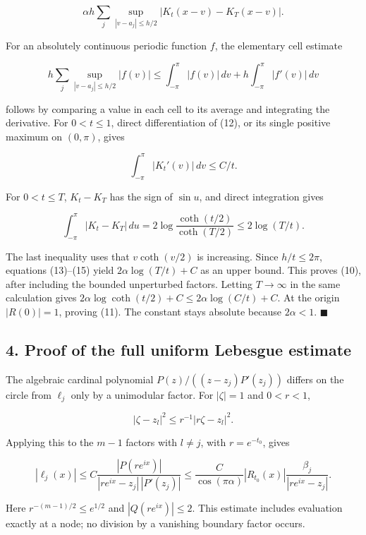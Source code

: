 \documentclass[10pt,a4paper]{article}
\begin{document}
\nopagebreak[4]
\[\alpha h\sum_j\sup_{|v-a_j|\le h/2}|K_t(x-v)-K_T(x-v)|. \tag{13}\]

For an absolutely continuous periodic function \(f\), the elementary
cell estimate

\nopagebreak[4]
\[h\sum_j\sup_{|v-a_j|\le h/2}|f(v)|
 \le\int_{-\pi}^{\pi}|f(v)|\,dv+h\int_{-\pi}^{\pi}|f'(v)|\,dv \tag{14}\]

follows by comparing a value in each cell to its average and integrating
the derivative. For \(0<t\le1\), direct differentiation of (12), or its
single positive maximum on \((0,\pi)\), gives

\nopagebreak[4]
\[\int_{-\pi}^{\pi}|K_t'(v)|\,dv\le C/t.\]

For \(0<t\le T\), \(K_t-K_T\) has the sign of \(\sin u\), and direct
integration gives

\nopagebreak[4]
\[\int_{-\pi}^{\pi}|K_t-K_T|\,du
 =2\log\frac{\coth(t/2)}{\coth(T/2)}
 \le2\log(T/t). \tag{15}\]

The last inequality uses that \(v\coth(v/2)\) is increasing. Since
\(h/t\le2\pi\), equations (13)--(15) yield \(2\alpha\log(T/t)+C\) as an
upper bound. This proves (10), after including the bounded unperturbed
factors. Letting \(T\to\infty\) in the same calculation gives
\(2\alpha\log\coth(t/2)+C\le2\alpha\log(C/t)+C\). At the origin
\(|R(0)|=1\), proving (11). The constant stays absolute because
\(2\alpha<1\). \ensuremath{\blacksquare}

\subsection{4. Proof of the full uniform Lebesgue
estimate}\label{proof-of-the-full-uniform-lebesgue-estimate}

The algebraic cardinal polynomial \(P(z)/((z-z_j)P'(z_j))\) differs on
the circle from \(\ell_j\) only by a unimodular factor. For
\(|\zeta|=1\) and \(0<r<1\),

\nopagebreak[4]
\[|\zeta-z_l|^2\le r^{-1}|r\zeta-z_l|^2.\]

Applying this to the \(m-1\) factors with \(l\ne j\), with
\(r=e^{-t_0}\), gives

\nopagebreak[4]
\[|\ell_j(x)|
 \le C\frac{|P(re^{ix})|}{|re^{ix}-z_j|\,|P'(z_j)|}
 \le\frac{C}{\cos(\pi\alpha)}
       |R_{t_0}(x)|\frac{\beta_j}{|re^{ix}-z_j|}. \tag{16}\]

Here \(r^{-(m-1)/2}\le e^{1/2}\) and \(|Q(re^{ix})|\le2\). This estimate
includes evaluation exactly at a node; no division by a vanishing
boundary factor occurs.
\end{document}
